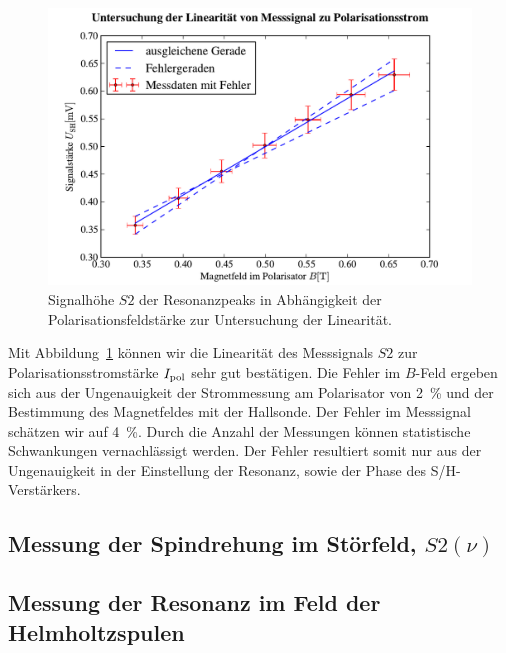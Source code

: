\documentclass[paper=a4,
	fontsize=10pt,
	DIV=18,
	twocolumn,
	parskip=half
	]{scrartcl}
\numberwithin{equation}{section}    %
\begin{document}
\begin{figure}[htp]
	\begin{center}
		\includegraphics[width=\columnwidth]{Data-Plots/04-signal-polarisationsstrom.pdf}
		\caption{Signalhöhe $S2$ der Resonanzpeaks in Abhängigkeit der Polarisationsfeldstärke zur Untersuchung der Linearität.}
		\label{fig.polarisationsstrom}
	\end{center}
\end{figure}

Mit Abbildung~\ref{fig.polarisationsstrom} können wir die Linearität des Messsignals $S2$ zur Polarisationsstromstärke $I_{\rm pol}$ sehr gut bestätigen. Die Fehler im $B$-Feld ergeben sich aus der Ungenauigkeit der Strommessung am Polarisator von \SI{2}{\percent} und der Bestimmung des Magnetfeldes mit der Hallsonde. Der Fehler im Messsignal schätzen wir auf \SI{4}{\percent}. Durch die Anzahl der Messungen können statistische Schwankungen vernachlässigt werden. Der Fehler resultiert somit nur aus der Ungenauigkeit in der Einstellung der Resonanz, sowie der Phase des S/H-Verstärkers.
\subsection{Messung der Spindrehung im Störfeld, $S2(\nu)$}
\label{auswertung5}


\subsection{Messung der Resonanz im Feld der Helmholtzspulen}
\label{auswertung6}
\end{document}
